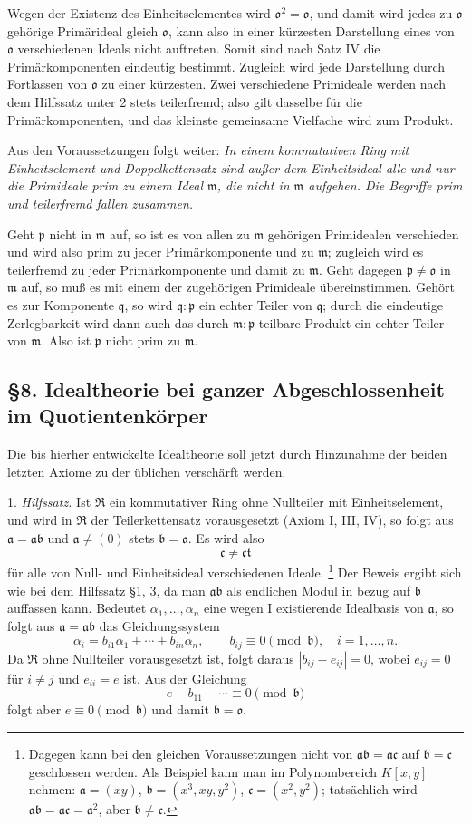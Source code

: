 \documentclass[11pt]{article}
\providecommand{\mR}{\mathfrak{R}}
\providecommand{\ma}{\mathfrak{a}}
\providecommand{\mb}{\mathfrak{b}}
\providecommand{\mc}{\mathfrak{c}}
\providecommand{\mm}{\mathfrak{m}}
\providecommand{\mo}{\mathfrak{o}}
\providecommand{\mpideal}{\mathfrak{p}}
\providecommand{\mq}{\mathfrak{q}}
\providecommand{\mt}{\mathfrak{t}}
\begin{document}
Wegen der Existenz des Einheitselementes wird $\mo^2=\mo$, und damit wird jedes zu $\mo$ gehörige Primärideal gleich $\mo$, kann also in einer kürzesten Darstellung eines von $\mo$ verschiedenen Ideals nicht auftreten. Somit sind nach Satz IV die Primärkomponenten eindeutig bestimmt. Zugleich wird jede Darstellung durch Fortlassen von $\mo$ zu einer kürzesten. Zwei verschiedene Primideale werden nach dem Hilfssatz unter 2 stets teilerfremd; also gilt dasselbe für die Primärkomponenten, und das kleinste gemeinsame Vielfache wird zum Produkt.

Aus den Voraussetzungen folgt weiter: \emph{In einem kommutativen Ring mit Einheitselement und Doppelkettensatz sind außer dem Einheitsideal alle und nur die Primideale prim zu einem Ideal $\mm$, die nicht in $\mm$ aufgehen. Die Begriffe prim und teilerfremd fallen zusammen.}

Geht $\mpideal$ nicht in $\mm$ auf, so ist es von allen zu $\mm$ gehörigen Primidealen verschieden und wird also prim zu jeder Primärkomponente und zu $\mm$; zugleich wird es teilerfremd zu jeder Primärkomponente und damit zu $\mm$. Geht dagegen $\mpideal\ne\mo$ in $\mm$ auf, so muß es mit einem der zugehörigen Primideale übereinstimmen. Gehört es zur Komponente $\mq$, so wird $\mq:\mpideal$ ein echter Teiler von $\mq$; durch die eindeutige Zerlegbarkeit wird dann auch das durch $\mm:\mpideal$ teilbare Produkt ein echter Teiler von $\mm$. Also ist $\mpideal$ nicht prim zu $\mm$.


\subsection*{§8. Idealtheorie bei ganzer Abgeschlossenheit im Quotientenkörper}

Die bis hierher entwickelte Idealtheorie soll jetzt durch Hinzunahme der beiden letzten Axiome zu der üblichen verschärft werden.

1. \emph{Hilfssatz.} Ist $\mR$ ein kommutativer Ring ohne Nullteiler mit Einheitselement, und wird in $\mR$ der Teilerkettensatz vorausgesetzt (Axiom I, III, IV), so folgt aus $\ma=\ma\mb$ und $\ma\ne(0)$ stets $\mb=\mo$. Es wird also
\[
        \mc\ne\mc\mt
\]
für alle von Null- und Einheitsideal verschiedenen Ideale.
\footnote{Dagegen kann bei den gleichen Voraussetzungen nicht von $\ma\mb=\ma\mc$ auf $\mb=\mc$ geschlossen werden. Als Beispiel kann man im Polynombereich $K[x,y]$ nehmen: $\ma=(xy)$, $\mb=(x^3,xy,y^2)$, $\mc=(x^2,y^2)$; tatsächlich wird $\ma\mb=\ma\mc=\ma^2$, aber $\mb\ne\mc$.}
Der Beweis ergibt sich wie bei dem Hilfssatz §1, 3, da man $\ma\mb$ als endlichen Modul in bezug auf $\mb$ auffassen kann. Bedeutet $\alpha_1,\ldots,\alpha_n$ eine wegen I existierende Idealbasis von $\ma$, so folgt aus $\ma=\ma\mb$ das Gleichungssystem
\[
        \alpha_i=b_{i1}\alpha_1+\cdots+b_{in}\alpha_n,
        \qquad b_{ij}\equiv0\pmod{\mb},\quad i=1,\ldots,n.
\]
Da $\mR$ ohne Nullteiler vorausgesetzt ist, folgt daraus $|b_{ij}-e_{ij}|=0$, wobei $e_{ij}=0$ für $i\ne j$ und $e_{ii}=e$ ist. Aus der Gleichung
\[
        e-b_{11}-\cdots\equiv0\pmod{\mb}
\]
folgt aber $e\equiv0\pmod{\mb}$ und damit $\mb=\mo$.
\end{document}
